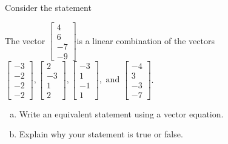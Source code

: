 
\begin{exerciseStatement}


Consider the statement 
\begin{center}\begin{minipage}{0.8\textwidth}
 The vector \( \left[\begin{array}{c}
4 \\
6 \\
-7 \\
-9
\end{array}\right] \)is a linear combination of the vectors \( \left[\begin{array}{c}
-3 \\
-2 \\
-2 \\
-2
\end{array}\right] , \left[\begin{array}{c}
2 \\
-3 \\
1 \\
2
\end{array}\right] , \left[\begin{array}{c}
-3 \\
1 \\
-1 \\
1
\end{array}\right] , \text{ and } \left[\begin{array}{c}
-4 \\
3 \\
-3 \\
-7
\end{array}\right] \). 
\end{minipage}\end{center}
    


\begin{enumerate}[(a)]
\item  Write an equivalent statement using a vector equation.
\item  Explain why your statement is true or false.
\end{enumerate}
    
\end{exerciseStatement}
    
